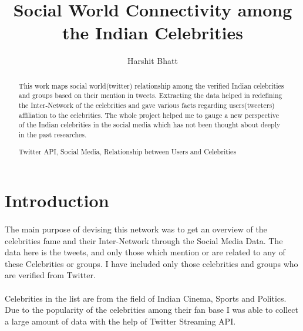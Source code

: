 \documentclass[runningheads,a4paper]{llncs}
\newcommand{\keywords}[1]{\par\addvspace\baselineskip
\noindent\keywordname\enspace\ignorespaces#1}
\begin{document}
\mainmatter

\title{Social World Connectivity among the Indian Celebrities}

\author{Harshit Bhatt}


\maketitle

\begin{abstract}
This work maps social world(twitter) relationship among the verified Indian celebrities and groups based on their mention in tweets. Extracting the data helped in redefining the Inter-Network of the celebrities and gave various facts regarding users(tweeters) affiliation to the celebrities. The whole project helped me to gauge a new perspective of the Indian celebrities in the social media which has not been thought about deeply in the past researches.

\keywords{Twitter API, Social Media, Relationship between Users and Celebrities}
\end{abstract}

\section{Introduction}

\paragraph{}
The main purpose of devising this network was to get an overview of the celebrities fame and their Inter-Network through the Social Media Data. The data here is the tweets, and only those which mention or are related to any of these Celebrities or groups. I have included only those celebrities and groups who are verified from Twitter.

\paragraph{}
Celebrities in the list are from the field of Indian Cinema, Sports and Politics. Due to the popularity of the celebrities among their fan base I was able to collect a large amount of data with the help of Twitter Streaming API.
\end{document}
